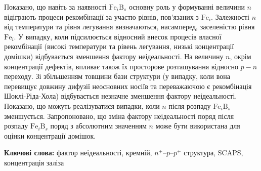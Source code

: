 \documentclass[12pt]{article}
\begin{document}
Показано, що навіть за наявності $\mathrm{Fe}_i\mathrm{B}_s$ основну роль у формуванні величини $n$
відіграють процеси рекомбінації за участю рівнів, пов'язаних з $\mathrm{Fe}_i$.
Залежності $n$ від температури та рівня легування визначаються, насамперед,
заселеністю рівня $\mathrm{Fe}_i$.
У випадку, коли підсилюється відносний внесок процесів власної рекомбінації (високі
температури та рівень легування, низькі концентрації домішки) відбувається зменшення фактору неідеальності.
На величину $n$, окрім концентрації дефектів, впливає також їх просторове розташування відносно $p-n$ переходу.
Зі збільшенням товщини бази структури (у випадку, коли вона перевищує довжину дифузії неосновних носіїв та
переважаючою є рекомбінація Шоклі-Ріда-Хола) відбувається незначне зменшення фактору неідеальності.
Показано, що можуть реалізуватися випадки, коли $n$ після розпаду $\mathrm{Fe}_i\mathrm{B}_s$ зменшується.
Запропоновано, що зміна фактору неідеальності поряд після розпаду $\mathrm{Fe}_i\mathrm{B}_s$ поряд з абсолютним значенням $n$  може бути використана
для оцінки концентрації домішок.


\textbf{Ключові слова:}
фактор неідеальності, кремній, $n^+$--$p$--$p^+$ структура, SCAPS, концентрація заліза
\end{document}
